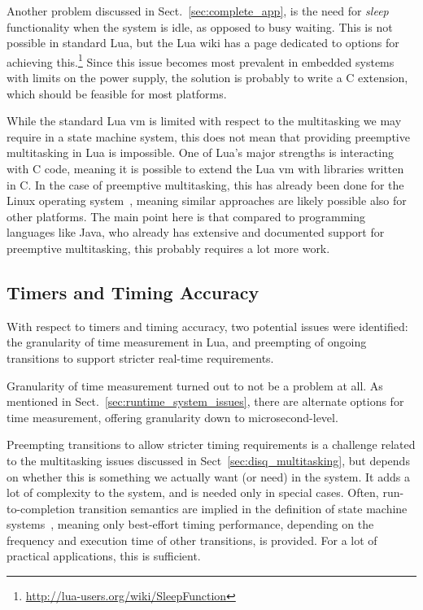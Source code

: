 \noindent
Another problem discussed in Sect.~\ref{sec:complete_app}, is the need for \emph{sleep} functionality when the system is idle, as opposed to busy waiting. This is not possible in standard Lua, but the Lua wiki has a page dedicated to options for achieving this.\footnote{\url{http://lua-users.org/wiki/SleepFunction}} Since this issue becomes most prevalent in embedded systems with limits on the power supply, the solution is probably to write a C extension, which should be feasible for most platforms.

\noindent
While the standard Lua \gls{vm} is limited with respect to the multitasking we may require in a state machine system, this does not mean that providing preemptive multitasking in Lua is impossible. One of Lua's major strengths is interacting with C code, meaning it is possible to extend the Lua \gls{vm} with libraries written in C. In the case of preemptive multitasking, this has already been done for the Linux operating system~\cite{techreport:lua_concurrent}, meaning similar approaches are likely possible also for other platforms. The main point here is that compared to programming languages like Java, who already has extensive and documented support for preemptive multitasking, this probably requires a lot more work.

\subsection{Timers and Timing Accuracy}
\label{sec:disq_timers}
With respect to timers and timing accuracy, two potential issues were identified: the granularity of time measurement in Lua, and preempting of ongoing transitions to support stricter real-time requirements.

\noindent
Granularity of time measurement turned out to not be a problem at all. As mentioned in Sect.~\ref{sec:runtime_system_issues}, there are alternate options for time measurement, offering granularity down to microsecond-level.

\noindent
Preempting transitions to allow stricter timing requirements is a challenge related to the multitasking issues discussed in Sect~\ref{sec:disq_multitasking}, but depends on whether this is something we actually want (or need) in the system. It adds a lot of complexity to the system, and is needed only in special cases. Often, run-to-completion transition semantics are implied in the definition of state machine systems~\cite{techreport:uml_state_machines}, meaning only best-effort timing performance, depending on the frequency and execution time of other transitions, is provided. For a lot of practical applications, this is sufficient.

